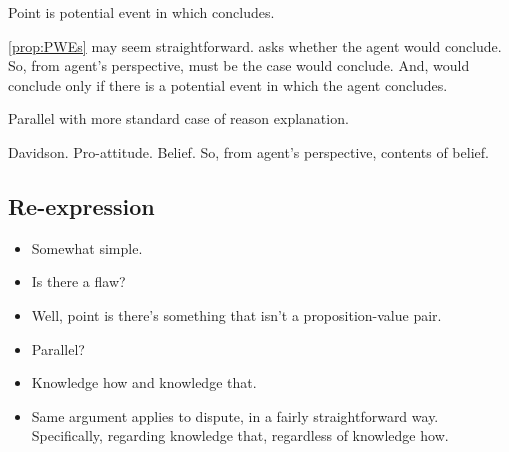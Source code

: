 \newpage

\begin{note}
  \color{blue}
  Point is potential event in which concludes.

  \autoref{prop:PWEs} may seem straightforward.
  \qzS{} asks whether the agent would conclude.
  So, from agent's perspective, must be the case would conclude.
  And, would conclude only if there is a potential event in which the agent concludes.

  Parallel with more standard case of reason explanation.

  Davidson.
  Pro-attitude.
  Belief.
  So, from agent's perspective, contents of belief.
\end{note}

\subsection{Re-expression}
\label{sec:answers-which-are}

\begin{note}
  \begin{itemize}
  \item
    Somewhat simple.
  \item
    Is there a flaw?
  \item
    Well, point is there's something that isn't a proposition-value pair.
  \item
    Parallel?
  \item
    Knowledge how and knowledge that.
  \item
    Same argument applies to dispute, in a fairly straightforward way.
    Specifically, regarding knowledge that, regardless of knowledge how.
  \end{itemize}
\end{note}

